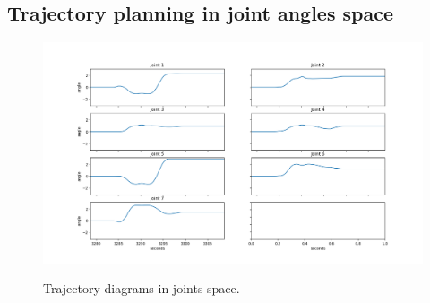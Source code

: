 \subsection{Trajectory planning in joint angles space}

\begin{center}
\begin{figure}[H]
\centering
\includegraphics[width=\textwidth]{images/trajectory1-test1.png}\\
\caption{Trajectory diagrams in joints space.}
\end{figure}
\end{center}
